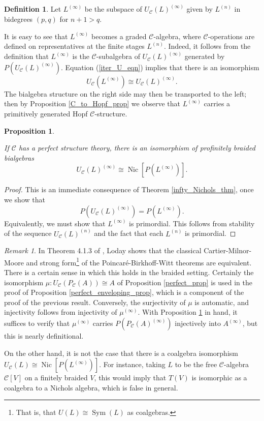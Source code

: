\documentclass[12pt]{article}
\DeclareMathOperator{\Nic}{Nic}
\DeclareMathOperator{\Sym}{Sym}
\newcommand{\CC} {\mathcal{C}}
\theoremstyle{plain}
\newtheorem{prop}[thm]{Proposition}
\theoremstyle{definition}
\newtheorem{defn}[thm]{Definition}
\theoremstyle{remark}
\newtheorem{rem}[thm]{Remark}
\begin{document}
\begin{defn}

Let $L^{(\infty)}$ be the subspace of $U_{\CC}(L)^{(\infty)}$ given by $L^{(n)}$ in bidegrees $(p,q)$ for $n+1>q$.

\end{defn}

It is easy to see that $L^{(\infty)}$ becomes a graded $\CC$-algebra, where $\CC$-operations are defined on representatives at the finite stages $L^{(n)}$.  Indeed, it follows from the definition that $L^{(\infty)}$ is the $\CC$-subalgebra of $U_{\CC}(L)^{(\infty)}$ generated by $P(U_{\CC}(L)^{(\infty)})$.  Equation (\ref{iter_U_eqn}) implies that there is an isomorphism
%
$$U_{\CC}(L^{(\infty)}) \cong U_{\CC}(L)^{(\infty)}.$$
%
The bialgebra structure on the right side may then be transported to the left; then by Proposition \ref{C_to_Hopf_prop} we observe that $L^{(\infty)}$ carries a primitively generated Hopf $\CC$-structure.

\begin{prop}  \label{pbw_C_prop}

If $\CC$ has a perfect structure theory, there is an isomorphism of profinitely braided bialgebras
%
$$U_{\CC}(L)^{(\infty)} \cong \Nic[P(L^{(\infty)})].$$

\end{prop}

\begin{proof}

This is an immediate consequence of Theorem \ref{infty_Nichols_thm}, once we show that 
%
$$P(U_{\CC}(L)^{(\infty)}) = P(L^{(\infty)}).$$
%
Equivalently, we must show that $L^{(\infty)}$ is primordial.  This follows from stability of the sequence $U_{\CC}(L)^{(n)}$ and the fact that each $L^{(n)}$ is primordial.

\end{proof}

\begin{rem} In Theorem 4.1.3 of \cite{loday}, Loday shows that the classical Cartier-Milnor-Moore and strong form\footnote{That is, that $U(L)\cong \Sym(L)$ as coalgebras.} of the Poincar\'e-Birkhoff-Witt theorems are equivalent. There is a certain sense in which this holds in the braided setting.  Certainly the isomorphism $\mu: U_{\CC}(P_{\CC}(A)) \cong A$ of Proposition \ref{perfect_prop} is used in the proof of Proposition \ref{perfect_enveloping_prop}, which is a component of the proof of the previous result.  Conversely, the surjectivity of $\mu$ is automatic, and injectivity follows from injectivity of $\mu^{(\infty)}$.  With Proposition \ref{pbw_C_prop} in hand, it suffices to verify that $\mu^{(\infty)}$ carries $P(P_{\CC}(A)^{(\infty)})$ injectively into $A^{(\infty)}$, but this is nearly definitional.  

On the other hand, it is not the case that there is a coalgebra isomorphism $U_{\CC}(L) \cong \Nic[P(L^{(\infty)})]$.  For instance, taking $L$ to be the free $\CC$-algebra $\CC[V]$ on a finitely braided $V$, this would imply that $T(V)$ is isomorphic as a coalgebra to a Nichols algebra, which is false in general.

\end{rem}
\end{document}
